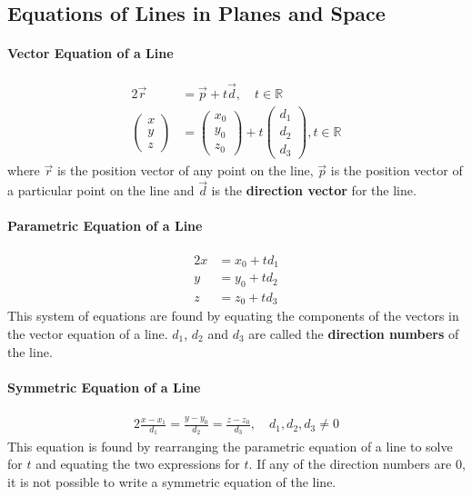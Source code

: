 \documentclass{report}
\newcommand\R{\mathbb{R}}
\theoremstyle{definition}
\numberwithin{equation}{section}
\begin{document}
\subsection{Equations of Lines in Planes and Space}

\paragraph{Vector Equation of a Line}
\begin{alignat}{2}
	\vec r &= \vec p + t \vec d, \quad t \in \R 
	\\
	\begin{pmatrix}
		x \\ y \\ z
	\end{pmatrix} 
	&= 
	\begin{pmatrix}
		x_0 \\ y_0 \\ z_0
	\end{pmatrix}
	+ t
	\begin{pmatrix}
		d_1 \\ d_2 \\ d_3
	\end{pmatrix}
	, t \in \R
\end{alignat}
where $\vec r$ is the position vector of any point on the line, $\vec p$ is the position vector of a particular point on the line and $\vec d$ is the \textbf{direction vector} for the line.

\paragraph{Parametric Equation of a Line}
\begin{alignat}{2}{}
	x &= x_0 + td_1 \\
	y &= y_0 + td_2 \\
	z &= z_0 + td_3
\end{alignat}
This system of equations are found by equating the components of the vectors in the vector equation of a line. $d_1$, $d_2$ and $d_3$ are called the \textbf{direction numbers} of the line.

\paragraph{Symmetric Equation of a Line}
\begin{alignat}{2}{}
	\frac{x-x_1}{d_1} = \frac{y-y_0}{d_2} = \frac{z-z_0}{d_3}, \quad d_1,d_2,d_3 \ne 0
\end{alignat}
This equation is found by rearranging the parametric equation of a line to solve for $t$ and equating the two expressions for $t$. If any of the direction numbers are $0$, it is not possible to write a symmetric equation of the line.
\end{document}
